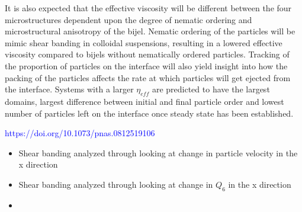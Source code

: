 It is also expected that the effective viscosity will be different between the four microstructures dependent upon the 
degree of nematic ordering and microstructural anisotropy of the bijel. Nematic ordering of the particles will be mimic 
shear banding in colloidal suspensions, resulting in a lowered effective viscosity compared to bijels without nematically 
ordered particles. \cite{xu_relation_2013, vermant_flow-induced_2005} Tracking of the proportion of particles on the 
interface will also yield insight into how the packing of the particles affects the rate at which particles will get 
ejected from the interface. Systems with a larger $\eta_{eff}$ are predicted to have the largest domains, largest 
difference between initial and final particle order and lowest number of particles left on the interface once steady 
state has been established. 

\textcolor{blue}{https://doi.org/10.1073/pnas.0812519106}

\begin{itemize}
    \item Shear banding analyzed through looking at change in particle velocity in the x direction
    \item Shear banding analyzed through looking at change in $Q_6$ in the x direction
    \item 
\end{itemize}
